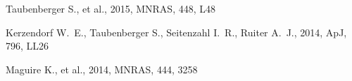 \documentclass[11pt]{article}
\begin{document}
\classicalbackup    %


\bigskip



\justifyduplications


\bigskip


% 

\publications          %
 Taubenberger S., et al., 2015, MNRAS, 448, 
L48 

 Kerzendorf W.~E., Taubenberger S., 
Seitenzahl I.~R., Ruiter A.~J., 2014, ApJ, 796, LL26

 Maguire K., et al., 2014, MNRAS, 444, 3258
\bigskip



%


\otherfacilities    %


\bigskip
\end{document}
